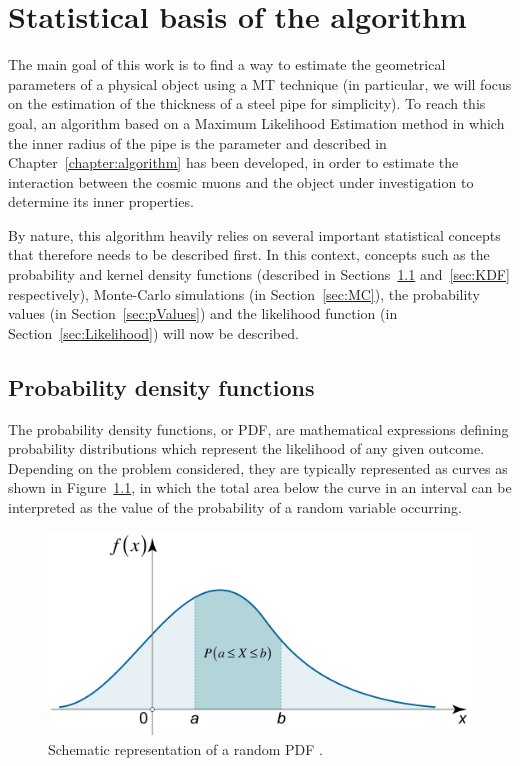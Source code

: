 \documentclass[a4paper, 11pt, twoside, openright]{report}
\begin{document}
\chapter{Statistical basis of the algorithm}

The main goal of this work is to find a way to estimate the geometrical parameters of a physical object using a MT technique (in particular, we will focus on the estimation of the thickness of a steel pipe for simplicity). To reach this goal, an algorithm based on a Maximum Likelihood Estimation method  in which the inner radius of the pipe is the parameter and described in Chapter~\ref{chapter:algorithm} has been developed, in order to estimate the interaction between the cosmic muons and the object under investigation to determine its inner properties.

By nature, this algorithm heavily relies on several important statistical concepts that therefore needs to be described first. In this context, concepts such as the probability and kernel density functions (described in Sections~\ref{sec:PDF} and~\ref{sec:KDF} respectively), Monte-Carlo simulations (in Section~\ref{sec:MC}), the probability values (in Section~\ref{sec:pValues}) and the likelihood function (in Section~\ref{sec:Likelihood}) will now be described.

\section{Probability density functions} \label{sec:PDF}

The probability density functions, or PDF, are mathematical expressions defining probability distributions which represent the likelihood of any given outcome. Depending on the problem considered, they are typically represented as curves as shown in Figure~\ref{fig:PDF}, in which the total area below the curve in an interval can be interpreted as the value of the probability of a random variable occurring. 

\begin{figure}[htbp]
\begin{center}
\includegraphics[width=12cm, height=5.4cm]{figs/PDF.png}
\caption{Schematic representation of a random PDF \cite{PDF}.}
\label{fig:PDF}
\end{center}
\end{figure}
\end{document}
